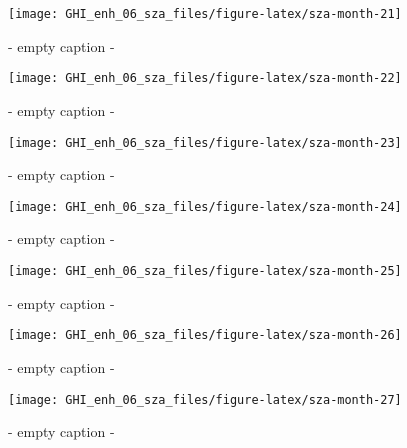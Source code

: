\documentclass[
  10pt,
  a4paper,oneside]{article}
\begin{document}
\begin{figure}[H]

{\centering \texttt{[image: GHI\_enh\_06\_sza\_files/figure-latex/sza-month-21]} 

}

\caption{ - empty caption - }\label{fig:sza-month-21}
\end{figure}
\begin{figure}[H]

{\centering \texttt{[image: GHI\_enh\_06\_sza\_files/figure-latex/sza-month-22]} 

}

\caption{ - empty caption - }\label{fig:sza-month-22}
\end{figure}
\begin{figure}[H]

{\centering \texttt{[image: GHI\_enh\_06\_sza\_files/figure-latex/sza-month-23]} 

}

\caption{ - empty caption - }\label{fig:sza-month-23}
\end{figure}
\begin{figure}[H]

{\centering \texttt{[image: GHI\_enh\_06\_sza\_files/figure-latex/sza-month-24]} 

}

\caption{ - empty caption - }\label{fig:sza-month-24}
\end{figure}
\begin{figure}[H]

{\centering \texttt{[image: GHI\_enh\_06\_sza\_files/figure-latex/sza-month-25]} 

}

\caption{ - empty caption - }\label{fig:sza-month-25}
\end{figure}
\begin{figure}[H]

{\centering \texttt{[image: GHI\_enh\_06\_sza\_files/figure-latex/sza-month-26]} 

}

\caption{ - empty caption - }\label{fig:sza-month-26}
\end{figure}
\begin{figure}[H]

{\centering \texttt{[image: GHI\_enh\_06\_sza\_files/figure-latex/sza-month-27]} 

}

\caption{ - empty caption - }\label{fig:sza-month-27}
\end{figure}
\end{document}
